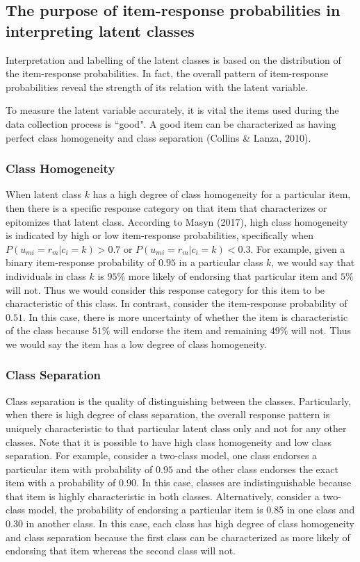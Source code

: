 \subsection{The purpose of item-response probabilities in \\ interpreting latent classes}
Interpretation and labelling of the latent classes is based on the distribution of the item-response probabilities. In fact, the overall pattern of item-response probabilities reveal the strength of its relation with the latent variable. 

To measure the latent variable accurately, it is vital the items used during the data collection process is ``good". A good item can be characterized as having perfect class homogeneity and class separation (Collins \& Lanza, 2010). 

\subsubsection{Class Homogeneity}
When latent class $k$ has a high degree of class homogeneity for a particular item, then there is a specific response category on that item that characterizes or epitomizes that latent class. According to Masyn (2017), high class homogeneity is indicated by high or low item-response probabilities, specifically when $P(u_{mi}=r_{m}|c_{i}=k) > 0.7$ or $P(u_{mi}=r_{m}|c_{i}=k) <  0.3$. For example, given a binary item-response probability of $0.95$ in a particular class $k$, we would say that individuals in class $k$ is $95\%$ more likely of endorsing that particular item and $5\%$ will not. Thus we would consider this response category for this item to be characteristic of this class. In contrast, consider the item-response probability of $0.51$. In this case, there is more uncertainty of whether the item is characteristic of the class because $51\%$ will endorse the item and remaining $49\%$ will not. Thus we would say the item has a low degree of class homogeneity. 

\subsubsection{Class Separation}
Class separation is the quality of distinguishing between the classes. Particularly, when there is high degree of class separation, the overall response pattern is uniquely characteristic to that particular latent class only and not for any other classes. Note that it is possible to have high class homogeneity and low class separation. For example, consider a two-class model, one class endorses a particular item with probability of $0.95$ and the other class endorses the exact item with a probability of $0.90$. In this case, classes are indistinguishable because that item is highly characteristic in both classes. Alternatively, consider a two-class model, the probability of endorsing a particular item is 0.85 in one class and 0.30 in another class. In this case, each class has high degree of class homogeneity and class separation because the first class can be characterized as more likely of endorsing that item whereas the second class will not. 

